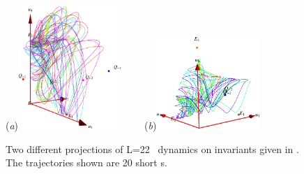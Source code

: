\begin{figure}[t]
\begin{center}
  (\textit{a})\includegraphics[width=0.35\textwidth]{../figs/ksSO2inv134.eps}
~~~~(\textit{b})\includegraphics[width=0.35\textwidth]{../figs/ksSO2inv145.eps}
\end{center}
\caption[KSe SO(2) reduced phase space with second set of modified invariants.]{ Two different projections
of L=22 \KS\ dynamics on invariants given in . The trajectories shown are 20 short \rpo s. }
\label{fig:SO2inv}
\end{figure}

 
